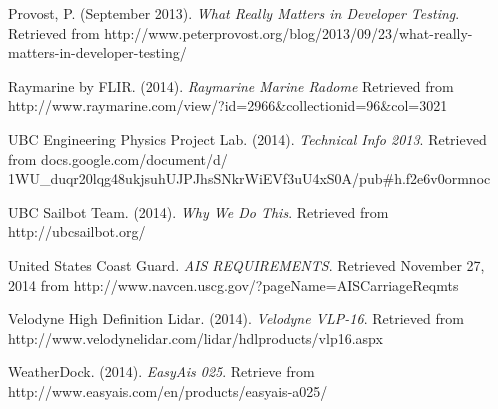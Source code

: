 \begin{thebibliography}{99}
 Provost, P. (September 2013). \textit{What Really Matters in Developer Testing}. Retrieved from http://www.peterprovost.org/blog/2013/09/23/what-really-matters-in-developer-testing/

 Raymarine by FLIR. (2014). \textit{Raymarine Marine Radome} Retrieved from http://www.raymarine.com/view/?id=2966\&collectionid=96\&col=3021

 UBC Engineering Physics Project Lab. (2014). \textit{Technical Info 2013}. Retrieved from docs.google.com/document/d/\\1WU\_duqr20lqg48ukjsuhUJPJhsSNkrWiEVf3uU4xS0A/pub\#h.f2e6v0ormnoc

 UBC Sailbot Team. (2014). \textit{Why We Do This}. Retrieved from http://ubcsailbot.org/

 United States Coast Guard. \textit{AIS REQUIREMENTS}. Retrieved November 27, 2014 from http://www.navcen.uscg.gov/?pageName=AISCarriageReqmts

 Velodyne High Definition Lidar. (2014). \textit{Velodyne VLP-16}. Retrieved from http://www.velodynelidar.com/lidar/hdlproducts/vlp16.aspx

 WeatherDock. (2014). \textit{EasyAis 025}. Retrieve from http://www.easyais.com/en/products/easyais-a025/

\end{thebibliography}